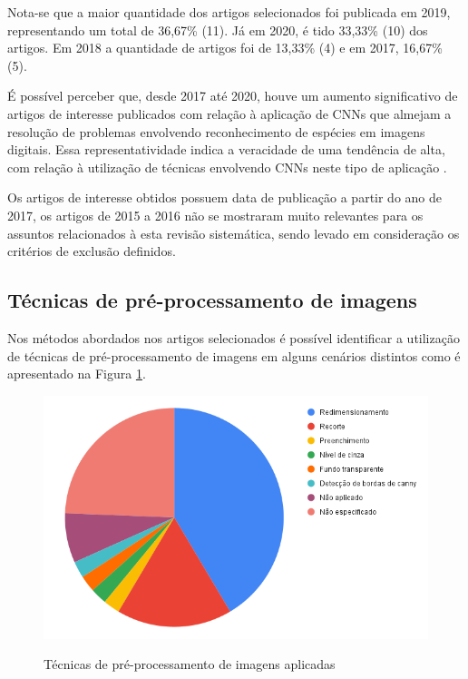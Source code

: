 \documentclass[
	12pt,				%
	oneside,			%
	a4paper,			%
	english,			%
	brazil				%
	]{abntex2ppgsi}
\begin{document}
Nota-se que a maior quantidade dos artigos selecionados foi publicada em 2019, representando um total de 36,67\% (11). Já em 2020, é tido 33,33\% (10) dos artigos. Em 2018 a quantidade de artigos foi de 13,33\% (4) e em 2017, 16,67\% (5).

É possível perceber que, desde 2017 até 2020, houve um aumento significativo de artigos de interesse publicados com relação à aplicação de CNNs que almejam a resolução de problemas envolvendo reconhecimento de espécies em imagens digitais. Essa representatividade indica a veracidade de uma tendência de alta, com relação à utilização de técnicas envolvendo CNNs neste tipo de aplicação \cite{liu2020classification}.

Os artigos de interesse obtidos possuem data de publicação a partir do ano de 2017, os artigos de 2015 a 2016 não se mostraram muito relevantes para os assuntos relacionados à esta revisão sistemática, sendo levado em consideração os critérios de exclusão definidos.

\subsection{Técnicas de pré-processamento de imagens}
Nos métodos abordados nos artigos selecionados é possível identificar a utilização de técnicas de pré-processamento de imagens em alguns cenários distintos como é apresentado na Figura \ref{fig:grafico_preprocessamento_vs_uso}.

\begin{figure}[H]
    \centering
    \caption{Técnicas de pré-processamento de imagens aplicadas}
    \includegraphics[width=1.0\textwidth]{imagens/revisao_sistematica/grafico_preprocessamento_vs_uso.png}
    \label{fig:grafico_preprocessamento_vs_uso}
\end{figure}
\end{document}
